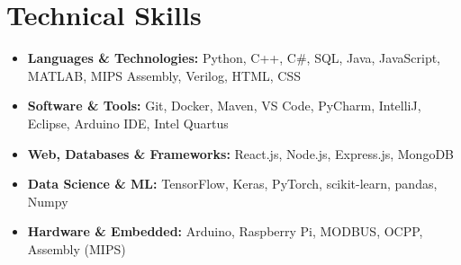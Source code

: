 \documentclass[letterpaper,11pt]{article}
\begin{document}
\section{Technical Skills}
\begin{itemize}[leftmargin=0mm, label={}, itemsep=-2pt]  %
  \small
    \item \textbf{Languages \& Technologies:} Python, C++, C#, SQL, Java, JavaScript, MATLAB, MIPS Assembly, Verilog, HTML, CSS
    \item \textbf{Software \& Tools:} Git, Docker, Maven, VS Code, PyCharm, IntelliJ, Eclipse, Arduino IDE, Intel Quartus
    \item \textbf{Web, Databases \& Frameworks:} React.js, Node.js, Express.js, MongoDB
    \item \textbf{Data Science \& ML:} TensorFlow, Keras, PyTorch, scikit-learn, pandas, Numpy
    \item \textbf{Hardware \& Embedded:} Arduino, Raspberry Pi, MODBUS, OCPP, Assembly (MIPS)
\end{itemize}
\end{document}
